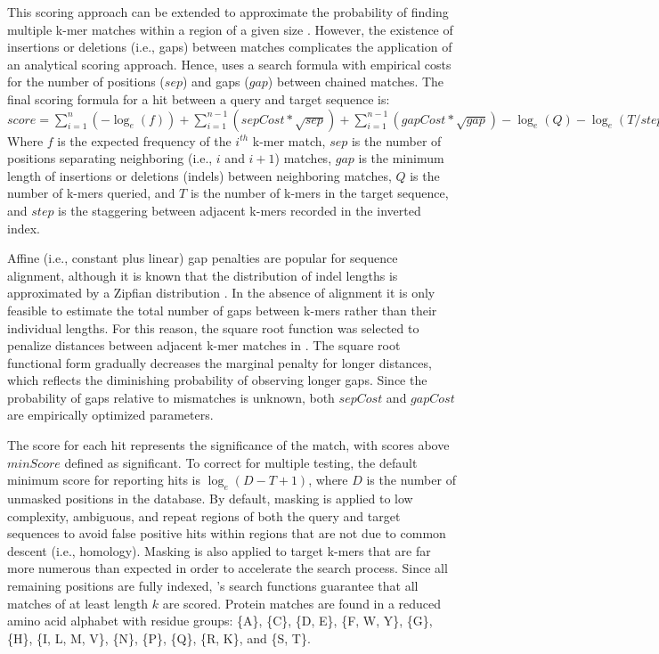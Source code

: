This scoring approach can be extended to approximate the probability of finding multiple k-mer matches within a region of a given size \citep{RN939}. However, the existence of insertions or deletions (i.e., gaps) between matches complicates the application of an analytical scoring approach. Hence,  uses a search formula with empirical costs for the number of positions (\(sep\)) and gaps (\(gap\)) between chained matches. The final scoring formula for a hit between a query and target sequence is: \newline \smallskip
\(score = \sum_{i=1}^{n}(-\log_e(f)) + \sum_{i=1}^{n-1}(sepCost*\sqrt{sep}) + \sum_{i=1}^{n-1}(gapCost*\sqrt{gap}) - \log_e(Q) - \log_e(T/step)\) \newline \smallskip
Where \(f\) is the expected frequency of the \(i^{th}\) k-mer match, \(sep\) is the number of positions separating neighboring (i.e., \(i\) and \(i + 1\)) matches, \(gap\) is the minimum length of insertions or deletions (indels) between neighboring matches, \(Q\) is the number of k-mers queried, and \(T\) is the number of k-mers in the target sequence, and \(step\) is the staggering between adjacent k-mers recorded in the inverted index.

Affine (i.e., constant plus linear) gap penalties are popular for sequence alignment, although it is known that the distribution of indel lengths is approximated by a Zipfian distribution \citep{RN4262}. In the absence of alignment it is only feasible to estimate the total number of gaps between k-mers rather than their individual lengths. For this reason, the square root function was selected to penalize distances between adjacent k-mer matches in . The square root functional form gradually decreases the marginal penalty for longer distances, which reflects the diminishing probability of observing longer gaps. Since the probability of gaps relative to mismatches is unknown, both \(sepCost\) and \(gapCost\) are empirically optimized parameters.

The score for each hit represents the significance of the match, with scores above \(minScore\) defined as significant. To correct for multiple testing, the default minimum score for reporting hits is \(\log_e(D - T + 1)\), where \(D\) is the number of unmasked positions in the database. By default, masking is applied to low complexity, ambiguous, and repeat regions of both the query and target sequences to avoid false positive hits within regions that are not due to common descent (i.e., homology). Masking is also applied to target k-mers that are far more numerous than expected in order to accelerate the search process. Since all remaining positions are fully indexed, 's search functions guarantee that all matches of at least length \(k\) are scored. Protein matches are found in a reduced amino acid alphabet with residue groups: \{A\}, \{C\}, \{D, E\}, \{F, W, Y\}, \{G\}, \{H\}, \{I, L, M, V\}, \{N\}, \{P\}, \{Q\}, \{R, K\}, and \{S, T\}.

